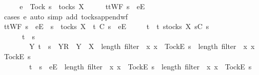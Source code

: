%
\isadelimproof
%
\endisadelimproof
%
\isatagproof
{}\isamarkupfalse%
\ {\isacharminus}\isanewline
\ \ \isamarkupfalse%
\ {\isachardoublequoteopen}e\ {\isasymnoteq}\ Tock{\isachardoublequoteclose}\ {\isachardoublequoteopen}s\ {\isasymin}\ tocks\ X{\isachardoublequoteclose}\isanewline
\ \ \isamarkupfalse%
\ \isamarkupfalse%
\ {\isachardoublequoteopen}ttWF\ {\isacharparenleft}s\ {\isacharat}\ {\isacharbrackleft}{\isacharbrackleft}e{\isacharbrackright}\isactrlsub E{\isacharbrackright}{\isacharparenright}{\isachardoublequoteclose}\isanewline
\ \ \ \ \isamarkupfalse%
\ {\isacharparenleft}cases\ e{\isacharcomma}\ auto\ simp\ add{\isacharcolon}\ tocks{\isacharunderscore}append{\isacharunderscore}wf{\isacharparenright}\isanewline
\ \ \isamarkupfalse%
\ \isamarkupfalse%
\ {\isachardoublequoteopen}ttWF\ {\isacharparenleft}s\ {\isacharat}\ {\isacharbrackleft}{\isacharbrackleft}e{\isacharbrackright}\isactrlsub E{\isacharbrackright}{\isacharparenright}\ {\isasymlongrightarrow}\ s\ {\isasymin}\ tocks\ X\ {\isasymlongrightarrow}\ t\ {\isasymlesssim}\isactrlsub C\ s\ {\isacharat}\ {\isacharbrackleft}{\isacharbrackleft}e{\isacharbrackright}\isactrlsub E{\isacharbrackright}\ {\isasymlongrightarrow}\isanewline
\ \ \ \ t\ {\isasymin}\ {\isacharbraceleft}t{\isachardot}\ {\isasymexists}s{\isacharprime}{\isasymin}tocks\ X{\isachardot}\ s{\isacharprime}{\isasymlesssim}\isactrlsub C\ s\ {\isasymand}\ \isanewline
\ \ \ \ \ \ {\isacharparenleft}t\ {\isacharequal}\ s{\isacharprime}\ {\isasymor}\ \isanewline
\ \ \ \ \ \ \ \ {\isacharparenleft}{\isasymexists}Y{\isachardot}\ t\ {\isacharequal}\ s{\isacharprime}\ {\isacharat}\ {\isacharbrackleft}{\isacharbrackleft}Y{\isacharbrackright}\isactrlsub R{\isacharbrackright}\ {\isasymand}\ Y\ {\isasymsubseteq}\ X\ {\isasymand}\ length\ {\isacharparenleft}filter\ {\isacharparenleft}{\isasymlambda}\ x{\isachardot}\ x\ {\isacharequal}\ {\isacharbrackleft}Tock{\isacharbrackright}\isactrlsub E{\isacharparenright}\ s{\isacharprime}{\isacharparenright}\ {\isacharless}\ length\ {\isacharparenleft}filter\ {\isacharparenleft}{\isasymlambda}\ x{\isachardot}\ x\ {\isacharequal}\ {\isacharbrackleft}Tock{\isacharbrackright}\isactrlsub E{\isacharparenright}\ s{\isacharparenright}{\isacharparenright}\ {\isasymor}\isanewline
\ \ \ \ \ \ \ \ {\isacharparenleft}t\ {\isacharequal}\ s{\isacharprime}\ {\isacharat}\ {\isacharbrackleft}{\isacharbrackleft}e{\isacharbrackright}\isactrlsub E{\isacharbrackright}\ {\isasymand}\ length\ {\isacharparenleft}filter\ {\isacharparenleft}{\isasymlambda}\ x{\isachardot}\ x\ {\isacharequal}\ {\isacharbrackleft}Tock{\isacharbrackright}\isactrlsub E{\isacharparenright}\ s{\isacharprime}{\isacharparenright}\ {\isacharequal}\ length\ {\isacharparenleft}filter\ {\isacharparenleft}{\isasymlambda}\ x{\isachardot}\ x\ {\isacharequal}\ {\isacharbrackleft}Tock{\isacharbrackright}\isactrlsub E{\isacharparenright}\ s{\isacharparenright}{\isacharparenright}{\isacharparenright}{\isacharbraceright}{\isachardoublequoteclose}\isanewline
